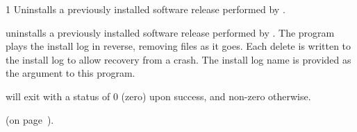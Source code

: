 \begin{ManPage}{\label{man-cleanup-release}}{1}
{ 
  Uninstalls a previously installed software release performed by
  . 
} 

\Synopsis {}


\Description {} uninstalls a previously installed
software release performed by .  The program
plays the install log in reverse, removing files as it goes.
Each delete is written to the install log to allow recovery from a
crash.  The install log name is provided as the  argument to
this program.

\begin{Options}
\end{Options}

\ExitStatus
{} will exit with a status of 0 (zero) upon success,
and non-zero otherwise.

\SeeAlso
{} (on page~\pageref{man-install-release}).

\end{ManPage}
